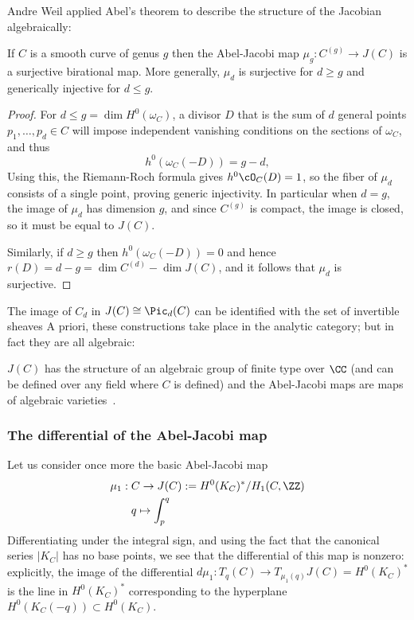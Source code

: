 Andre Weil applied Abel's theorem to describe the structure of the Jacobian algebraically:

\begin{corollary}
If $C$ is a smooth curve of genus $g$ then the Abel-Jacobi map $\mu_{g}: C^{(g)} \to J(C)$ is a surjective birational map.
More generally, $\mu_{d}$ is surjective for $d\geq g$ and generically injective for $d\leq g$.
\end{corollary}

\begin{proof}
For $d\leq g = \dim H^{0}(\omega_{C})$,  a divisor $D$ that is the sum of $d$ general points $p_{1}, \dots,  p_{d} \in C$ will impose independent vanishing conditions on the sections of $\omega_{C}$, and thus
$$
h^0(\omega_C(-D)) = g-d,
$$
 Using this, the Riemann-Roch formula gives $h^{0}\cO_{C}(D) = 1$, so the fiber of 
$\mu_{d}$ consists of a single point, proving generic injectivity. In particular when $d= g$, the image of $\mu_{d}$ has
dimension $g$, and since $C^{(g)}$ is compact, the image is closed, so it must be equal to $J(C)$.

Similarly, if $d \geq g$ then $h^0(\omega_C(-D)) = 0$ and hence $r(D) = d-g= \dim C^{(d)} - \dim J(C)$, and it follows that
$\mu_{d}$ is surjective.
\end{proof}

The image of $C_d$ in $J(C)\cong \Pic_d(C)$ can be identified with the set of invertible sheaves 
A priori, these constructions take place in the analytic category; but in fact they are all algebraic:

\begin{fact}
$J(C)$ has the structure of an algebraic group of finite type over $\CC$ (and can be defined over any field where $C$ is defined) and the Abel-Jacobi maps are
maps of algebraic varieties~\cite[]{Kleiman-PicardScheme}.
\end{fact}

\subsubsection{The differential of the Abel-Jacobi map}

Let us consider once more the basic Abel-Jacobi map
$$
\begin{aligned}
\mu_1 : \; &C \to J(C) := H^0(K_C)^*/H_1(C, \ZZ) \\
&q \mapsto \int_p^q 
\end{aligned}
$$
Differentiating under the integral sign, and using the fact that the canonical series $|K_C|$ has no base points, we see  that the differential of this map is nonzero: explicitly, the image of the differential $d\mu_1 : T_q(C) \to T_{\mu_1(q)}J(C) = H^0(K_C)^*$ is the line in $H^0(K_C)^*$ corresponding to the hyperplane $H^0(K_C(-q)) \subset H^0(K_C)$.

